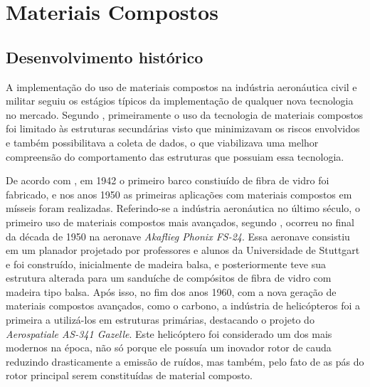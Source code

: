 \chapter[Materiais Compostos]{Materiais Compostos}

\section{Desenvolvimento histórico}
A implementação do uso de materiais compostos na indústria aeronáutica civil e militar seguiu os estágios típicos da implementação de qualquer nova tecnologia no mercado. Segundo \cite{kassapoglou2013design}, primeiramente o uso da tecnologia de materiais compostos foi limitado às estruturas secundárias visto que minimizavam os riscos envolvidos e também possibilitava a coleta de dados, o que viabilizava uma melhor compreensão do comportamento das estruturas que possuiam essa tecnologia.

De acordo com \cite{daniel2006engineering}, em 1942 o primeiro barco constiuído de fibra de vidro foi fabricado, e nos anos 1950 as primeiras aplicações com materiais compostos em mísseis foram realizadas. Referindo-se a indústria aeronáutica no último século, o primeiro uso de materiais compostos mais avançados, segundo \cite{kassapoglou2013design}, ocorreu no final da década de 1950 na aeronave \emph{Akaflieg Phonix FS-24}. Essa aeronave consistiu em um planador projetado por professores e alunos da Universidade de Stuttgart e foi construído, inicialmente de madeira balsa, e posteriormente teve sua estrutura alterada para um sanduíche de compósitos de fibra de vidro com madeira tipo balsa. Após isso, no fim dos anos 1960, com a nova geração de materiais compostos avançados, como o carbono, a indústria de helicópteros foi a primeira a utilizá-los em estruturas primárias, destacando o projeto do \emph{Aerospatiale AS-341 Gazelle}. Este helicóptero foi considerado um dos mais modernos na época, não só porque ele possuía um inovador rotor de cauda reduzindo drasticamente a emissão de ruídos, mas também, pelo fato de as pás do rotor principal serem constituídas de material composto.

